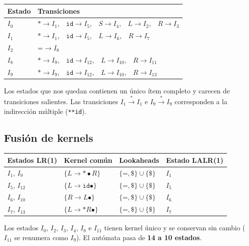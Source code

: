 \documentclass[12pt, letterpaper]{article}
\newcommand{\tl}[1]{\texttt{#1}}
\newcommand{\der}{\ensuremath{\rightarrow}}
\newcommand{\pto}{\ensuremath{\bullet}}
\begin{document}
\begin{center}
\begin{tabular}{l l}
\toprule
Estado & Transiciones \\
\midrule
$I_0$ & $\tl{*} \to I_1$,\ \ $\tl{id} \to I_5$,\ \ $S \to I_4$,\ \ $L \to I_2$,\ \ $R \to I_3$ \\
$I_1$ & $\tl{*} \to I_1$,\ \ $\tl{id} \to I_5$,\ \ $L \to I_6$,\ \ $R \to I_7$ \\
$I_2$ & $\tl{=} \to I_8$ \\
$I_8$ & $\tl{*} \to I_9$,\ \ $\tl{id} \to I_{12}$,\ \ $L \to I_{10}$,\ \ $R \to I_{11}$ \\
$I_9$ & $\tl{*} \to I_9$,\ \ $\tl{id} \to I_{12}$,\ \ $L \to I_{10}$,\ \ $R \to I_{13}$ \\
\bottomrule
\end{tabular}
\end{center}
 
\noindent Los estados que nos quedan contienen un único ítem completo y
carecen de transiciones salientes. Las transiciones $I_1 \xrightarrow{\tl{*}} I_1$ e $I_9 \xrightarrow{\tl{*}} I_9$
corresponden a la indirección múltiple (\tl{**id}).
 
\subsection{Fusión de kernels}
 
 
\begin{center}
\begin{tabular}{l l l l}
\toprule
Estados LR(1) & Kernel común & Lookaheads & Estado LALR(1) \\
\midrule
$I_1$, $I_9$    & $\{L \der \tl{*} \pto R\}$ & $\{\tl{=},\tl{\$}\} \cup \{\tl{\$}\}$ & $I_1$ \\
$I_5$, $I_{12}$ & $\{L \der \tl{id} \pto\}$  & $\{\tl{=},\tl{\$}\} \cup \{\tl{\$}\}$ & $I_5$ \\
$I_6$, $I_{10}$ & $\{R \der L \pto\}$        & $\{\tl{=},\tl{\$}\} \cup \{\tl{\$}\}$ & $I_6$ \\
$I_7$, $I_{13}$ & $\{L \der \tl{*} R \pto\}$ & $\{\tl{=},\tl{\$}\} \cup \{\tl{\$}\}$ & $I_7$ \\
\bottomrule
\end{tabular}
\end{center}
 
\noindent Los estados $I_0$, $I_2$, $I_3$, $I_4$, $I_8$ e $I_{11}$ tienen
kernel único y se conservan sin cambio ($I_{11}$ se renumera como $I_9$).
El autómata pasa de \textbf{14 a 10 estados}.
 
\end{document}
